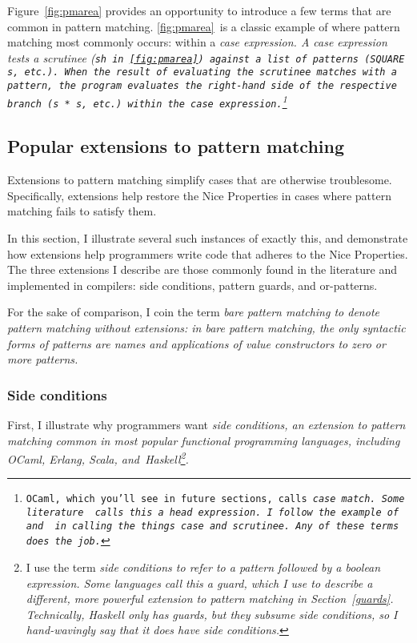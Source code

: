 \documentclass[manuscript,screen,review, 12pt, nonacm]{acmart}
\begin{document}
    Figure~\ref{fig:pmarea} provides an opportunity to introduce a few terms
    that are common in pattern matching. \ref{fig:pmarea}~is a classic example
    of where pattern matching most commonly occurs: within a \it{case}
    expression. A \it{case} expression tests a \it{scrutinee} (\tt{sh}
    in~\ref{fig:pmarea}) against a list of patterns (\tt{SQUARE s}, etc.). When
    the result of evaluating the scrutinee matches with a pattern, the program
    evaluates the right-hand side of the respective branch (\tt{s * s}, etc.)
    within the \it{case} expression.\footnote{OCaml, which you'll see in future
    sections, calls \it{case} \tt{match}. Some literature~\citep{guardproposal}
    calls this a \it{head expression}. I follow the example of~\citet{bpc} and
    \citet{maranget} in calling the things \it{case} and \it{scrutinee}. Any of
    these terms does the job.} 

\subsection{Popular extensions to pattern matching}
\label{extensions}

    Extensions to pattern matching simplify cases that are otherwise
    troublesome. Specifically, extensions help restore the Nice Properties in
    cases where pattern matching fails to satisfy them. 
    
    In this section, I illustrate several such instances of exactly this, and
    demonstrate how extensions help programmers write code that adheres to the
    Nice Properties. The three extensions I describe are those commonly found in
    the literature and implemented in compilers: side conditions, pattern
    guards, and or-patterns. 
    
    For the sake of comparison, I coin the term \it{bare pattern matching} to
    denote pattern matching \it{without} extensions: in bare pattern matching,
    the only syntactic forms of patterns are names and applications of value
    constructors to zero or more patterns. 



\subsubsection{Side conditions}

    First, I illustrate why programmers want \it{side conditions}, an extension
    to pattern matching common in most popular functional programming languages,
    including OCaml, Erlang, Scala, and~Haskell\footnote{I use the term \it{side
    conditions} to refer to a pattern followed by a boolean expression. Some
    languages call this a \it{guard}, which I use to describe a different, more
    powerful extension to pattern matching in Section~\ref{guards}.  
    Technically, Haskell \it{only} has guards, but they subsume side conditions,
    so I hand-wavingly say that it does have side conditions.}. 
    
\end{document}
